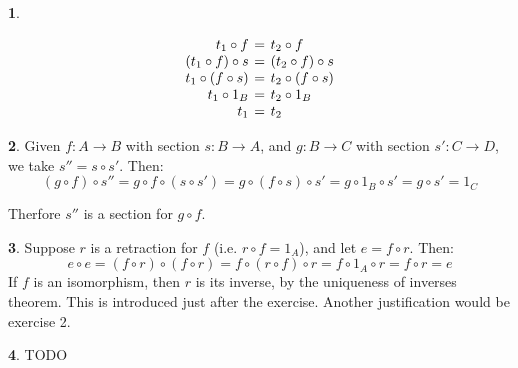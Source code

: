 \documentclass{article}
\theoremstyle{definition}
\theoremstyle{definition}
\theoremstyle{definition}
\newtheorem{solution-internal}{}[subsection]
\newenvironment{solution}{
  \begin{solution-internal}
}{
  \end{solution-internal}
}
\begin{document}
\begin{solution}
$ $\newline
\begin{minipage}{.4\textwidth}
\[ 
\arraycolsep=2pt
\begin{array}{rcl}
  t_1 \circ f &=& t_2 \circ f \\
  (t_1 \circ f) \circ s &=& (t_2 \circ f) \circ s \\
  t_1 \circ (f \circ s) &=& t_2 \circ (f \circ s) \\
  t_1 \circ 1_B &=& t_2 \circ 1_B \\
  t_1 &=& t_2 \\
\end{array}
\]
\end{minipage}%
\begin{minipage}{.4\textwidth}
\end{minipage}%
\end{solution}

\begin{solution}
Given $f\colon A \to B$ with section $s\colon B \to A$, and $g\colon B \to C$ with section $s'\colon C \to D$, we take $s'' = s \circ s'$. Then:
\[ (g \circ f) \circ s'' = g \circ f \circ (s \circ s') = g \circ (f \circ s) \circ s' = g \circ 1_B \circ s' = g \circ s' = 1_C \]

Therfore $s''$ is a section for $g \circ f$.
\end{solution}

\begin{solution}
Suppose $r$ is a retraction for $f$ (i.e. $r \circ f = 1_A$), and let $e = f \circ r$. Then:
\[ e \circ e = (f \circ r) \circ (f \circ r) = f \circ (r \circ f) \circ r = f \circ 1_A \circ r = f \circ r = e \]
If $f$ is an isomorphism, then $r$ is its inverse, by the uniqueness of
inverses theorem. This is introduced just after the exercise. Another
justification would be exercise 2.
\end{solution}

\begin{solution}
TODO
\end{solution}
\end{document}
